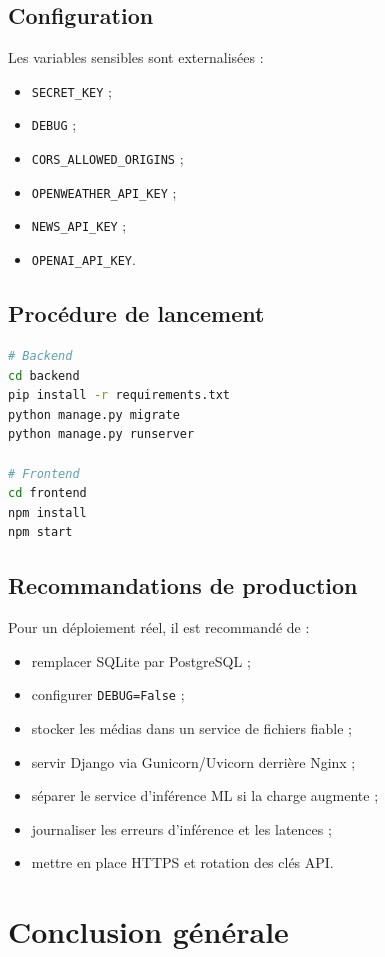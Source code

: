 \documentclass[12pt,a4paper]{report}
\begin{document}
\section{Configuration}
Les variables sensibles sont externalisées :
\begin{itemize}[noitemsep]
  \item \texttt{SECRET\_KEY} ;
  \item \texttt{DEBUG} ;
  \item \texttt{CORS\_ALLOWED\_ORIGINS} ;
  \item \texttt{OPENWEATHER\_API\_KEY} ;
  \item \texttt{NEWS\_API\_KEY} ;
  \item \texttt{OPENAI\_API\_KEY}.
\end{itemize}

\section{Procédure de lancement}
\begin{lstlisting}[language=bash]
# Backend
cd backend
pip install -r requirements.txt
python manage.py migrate
python manage.py runserver

# Frontend
cd frontend
npm install
npm start
\end{lstlisting}

\section{Recommandations de production}
Pour un déploiement réel, il est recommandé de :
\begin{itemize}[noitemsep]
  \item remplacer SQLite par PostgreSQL ;
  \item configurer \texttt{DEBUG=False} ;
  \item stocker les médias dans un service de fichiers fiable ;
  \item servir Django via Gunicorn/Uvicorn derrière Nginx ;
  \item séparer le service d'inférence ML si la charge augmente ;
  \item journaliser les erreurs d'inférence et les latences ;
  \item mettre en place HTTPS et rotation des clés API.
\end{itemize}

\chapter{Conclusion générale}
\end{document}
